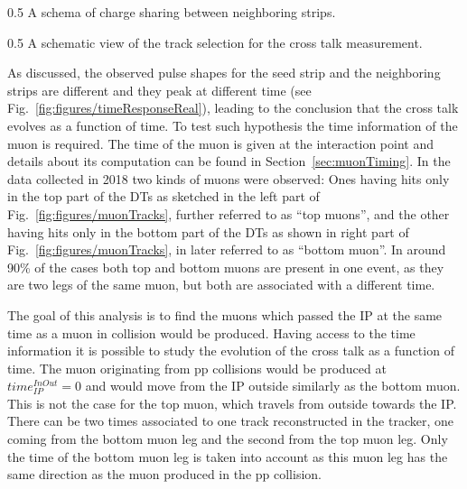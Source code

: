                  {0.5}       %
                 { A schema of charge sharing between neighboring strips. }

                 {0.5}       %
                 { A schematic view of the track selection for the cross talk measurement. }


As discussed, the observed pulse shapes for the seed strip and the neighboring strips are different and they peak at different time (see Fig.~\ref{fig:figures/timeResponseReal}), leading to the conclusion that the cross talk evolves as a function of time. To test such hypothesis the time information of the muon is required. The time of the muon is given at the interaction point and details about its computation can be found in Section~\ref{sec:muonTiming}. In the data collected in 2018 two kinds of muons were observed: Ones having hits only in the top part of the DTs as sketched in the left part of Fig.~\ref{fig:figures/muonTracks}, further referred to as ``top muons'',  and the other having hits only in the bottom part of the DTs as shown in right part of Fig.~\ref{fig:figures/muonTracks}, in later referred to as ``bottom muon''. In around 90\% of the cases both top and bottom muons are present in one event, as they are two legs of the same muon, but both are associated with a different time. 

The goal of this analysis is to find the muons which passed the IP at the same time as a muon in collision would be produced. Having access to the time information it is possible to study the evolution of the cross talk as a function of time. The muon originating from pp collisions would be produced at $time_{IP}^{InOut}=0$ and would move from the IP outside similarly as the bottom muon. This is not the case for the top muon, which travels from outside towards the IP. There can be two times associated to one track reconstructed in the tracker, one coming from the bottom muon leg and the second from the top muon leg. Only the time of the bottom muon leg is taken into account as this muon leg has the same direction as the muon produced in the pp collision. 

